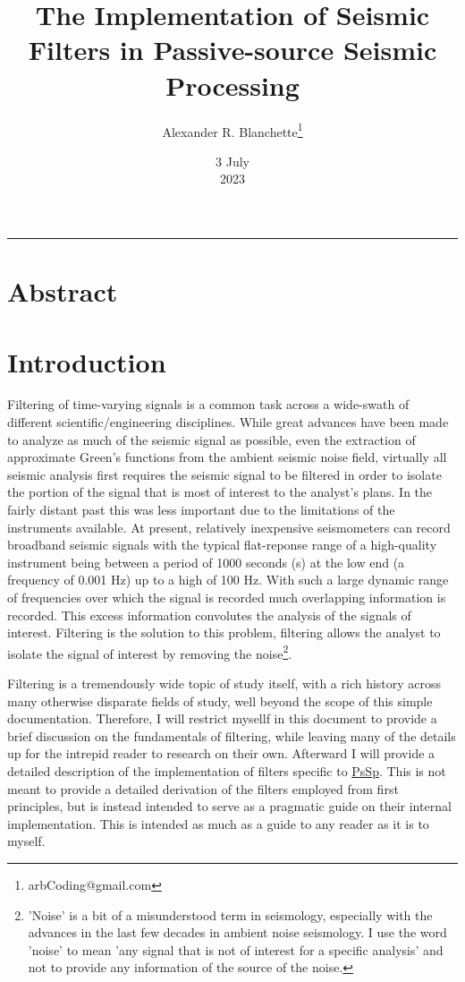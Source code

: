 \documentclass[12pt, letterpaper]{article}
\title{The Implementation of Seismic Filters in Passive-source Seismic Processing}
\author{Alexander R. Blanchette\thanks{arbCoding@gmail.com}}
\date{3 July\\2023}
\begin{document}
\maketitle
\noindent\rule{\textwidth}{1pt}

\section{Abstract} \label{Abstract}


\section{Introduction} \label{Introduction}
Filtering of time-varying signals is a common task across a wide-swath of different scientific/engineering disciplines.
While great advances have been made to analyze as much of the seismic signal as possible, even the extraction of approximate
Green's functions from the ambient seismic noise field, virtually all seismic analysis first requires the seismic signal to
be filtered in order to isolate the portion of the signal that is most of interest to the analyst's plans. In the fairly
distant past this was less important due to the limitations of the instruments available. At present, relatively inexpensive
seismometers can record broadband seismic signals with the typical flat-reponse range of a high-quality instrument being between
a period of 1000 seconds (s) at the low end (a frequency of 0.001 Hz) up to a high of 100 Hz. With such a large dynamic range
of frequencies over which the signal is recorded much overlapping information is recorded. This excess information convolutes
the analysis of the signals of interest. Filtering is the solution to this problem, filtering allows the analyst to isolate
the signal of interest by removing the noise\footnote{'Noise' is a bit of a misunderstood term in seismology, especially with the advances in
the last few decades in ambient noise seismology. I use the word 'noise' to mean 'any signal that is not of interest for a specific
analysis' and not to provide any information of the source of the noise.}.

Filtering is a tremendously wide topic of study itself, with a rich history across many otherwise disparate fields of study, well
beyond the scope of this simple documentation. Therefore, I will restrict mysellf in this document to provide a brief discussion
on the fundamentals of filtering, while leaving many of the details up for the intrepid reader to research on their own. Afterward
I will provide a detailed description of the implementation of filters specific to \href{https://github.com/arbCoding/PsSp}{PsSp}.
This is not meant to provide a detailed derivation of the filters employed from first principles, but is instead intended to serve as
a pragmatic guide on their internal implementation. This is intended as much as a guide to any reader as it is to myself.
\end{document}
